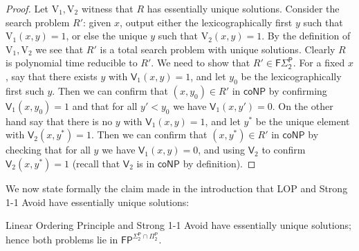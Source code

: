\begin{proof}
Let $\mathrm{V}_1,\mathrm{V}_2$ witness that $R$ has essentially unique solutions. Consider the search problem $R'$: given $x$, output either the lexicographically first $y$ such that $\mathrm{V}_1(x,y)=1$, or else the unique $y$ such that $\mathrm{V}_2(x,y)=1$. By the definition of $\mathrm{V}_1,\mathrm{V}_2$ we see that $R'$ is a total search problem with unique solutions. Clearly $R$ is polynomial time reducible to $R'$. We need to show that $R' \in \mathsf{F\Sigma_2^P}$. For a fixed $x$, say that there exists $y$ with $\mathsf{V}_1(x,y)=1$, and let $y_0$ be the lexicographically first such $y$. Then we can confirm that $(x,y_0) \in R'$ in $\mathsf{coNP}$ by confirming $\mathsf{V}_1(x,y_0)=1$ and that for all $y'<y_0$ we have $\mathsf{V}_1(x,y')=0$. On the other hand say that there is no $y$ with $\mathsf{V}_1(x,y)=1$, and let $y^*$ be the unique element with $\mathsf{V}_2(x,y^*)=1$. Then we can confirm that $(x,y^*) \in R'$ in $\mathsf{coNP}$ by checking that for all $y$ we have $\mathsf{V}_1(x,y)=0$, and using $\mathsf{V}_2$ to confirm $\mathsf{V}_2(x,y^*)=1$ (recall that $\mathsf{V}_2$ is in $\mathsf{coNP}$ by definition).
\end{proof}
We now state formally the claim made in the introduction that {\sc LOP} and {\sc Strong 1-1 Avoid} have essentially unique solutions:
\begin{lemma}\label{lem:1-1-lop-unique}
{\sc Linear Ordering Principle} and {\sc Strong 1-1 Avoid} have essentially unique solutions; hence both problems lie in $\mathsf{FP^{\Sigma_2^P \cap \Pi_2^P}}$.
\end{lemma}
